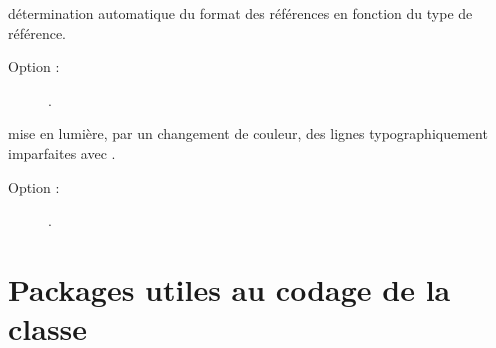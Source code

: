 \documentclass{letgut}
\begin{document}
\begin{ctannews}
\item[cleveref] détermination automatique du format des références en fonction
  du type de référence.
  \begin{description}
  \item[Option :] .
  \end{description}
\item[lua-typo] mise en lumière, par un changement de couleur, des lignes
  typographiquement imparfaites avec .
  \begin{description}
  \item[Option :] .
  \end{description}
\end{ctannews}

\section{Packages utiles au codage de la classe }
\label{sec:utiles-au-codage}
\end{document}
